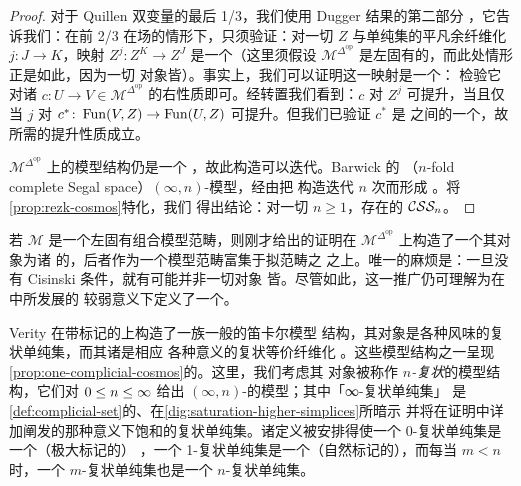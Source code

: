 \begin{proof}
对于 Quillen 双变量\trAdjunction{}的最后 1/3，我们使用 Dugger 结果的第二部分
\cite[3.2]{bib35}，它告诉我们：在前 2/3 在场的情形下，只须验证：对一切%
\trRezkObject{} $Z$ 与单纯集的平凡余纤维化 $j\colon J\to K$，映射
$Z^{j}\colon Z^{K}\to Z^{J}$ 是一个\trRezkWeakEquivalence（这里须假设
$\mathcal{M}^{\Delta^{\mathrm{op}}}$ 是左固有的，而此处情形正是如此，因为一切
对象皆\trCofibrant）。事实上，我们可以证明这一映射是一个\trTrivialFibration：
检验它对诸\trMonomorphism{} $c\colon U\to V\in\mathcal{M}^{\Delta^{\mathrm{op}}}$
的右\trLifting{}性质即可。经转置我们看到：$c$ 对 $Z^{j}$ 可提升，当且仅当 $j$
对 $c^{\ast}\colon\operatorname{Fun}(V,Z)\to\operatorname{Fun}(U,Z)$ 可提升。但我们已验证 $c^{\ast}$ 是%
\trQuasiCategory{}之间的一个\trIsofibration，故所需的提升性质成立。

$\mathcal{M}^{\Delta^{\mathrm{op}}}$ 上\trRezkObject{}的模型结构仍是一个%
\trCisinskiModelStructure，故此构造可以迭代。Barwick 的 \textbf{\trNFoldCompleteSegalSpace}
（$n$-fold complete Segal space）$(\infty,n)$-\trCategory{}模型，经由把%
\trRezkObject{}构造迭代 $n$ 次而形成 \cite{bib6}。将\cref{prop:rezk-cosmos}特化，我们
得出结论：对一切 $n\ge 1$，存在\trNFoldCompleteSegalSpace{}的%
\trInfinityCosmos{} $\mathcal{C}\mathcal{S}\mathcal{S}_{n}$。
\end{proof}

\begin{remark}\label{rem:rezk-left-proper}
若 $\mathcal{M}$ 是一个左固有组合模型范畴，则刚才给出的证明在
$\mathcal{M}^{\Delta^{\mathrm{op}}}$ 上构造了一个其\trFibrant{}对象为诸%
\trRezkObject{}的\trModelStructure，后者作为一个模型范畴富集于拟范畴之\trModelStructure{}%
之上。唯一的麻烦是：一旦没有 Cisinski 条件，就有可能并非一切\trFibrant{}对象
皆\trCofibrant。尽管如此，这一推广仍可理解为在 \cite[\S2]{bib110} 中所发展的
较弱意义下定义了一个\trInfinityCosmos。
\end{remark}

Verity 在带标记\trSimplicialSet{}的\trCategory{}上构造了一族一般的笛卡尔模型
结构，其\trFibrant{}对象是各种风味的复状单纯集，而其诸\trFibration{}是相应
各种意义的复状等价纤维化 \cite[\S9.3]{bib129}。这些模型结构之一呈现
\cref{prop:one-complicial-cosmos}的\trInfinityCosmos。这里，我们考虑其%
\trFibrant{}对象被称作 \emph{$n$-复状\trSimplicialSet}的模型结构，它们对
$0\le n\le\infty$ 给出 $(\infty,n)$-\trCategory{}的模型；其中「∞-复状单纯集」
是\cref{def:complicial-set}的、在\cref{dig:saturation-higher-simplices}所暗示
并将在证明中详加阐发的那种意义下饱和的复状单纯集。诸定义被安排得使一个
0-复状单纯集是一个（极大标记的）%
\trKanComplex，一个 1-复状单纯集是一个（自然标记的）\trQuasiCategory，而每当
$m<n$ 时，一个 $m$-复状单纯集也是一个 $n$-复状单纯集。

